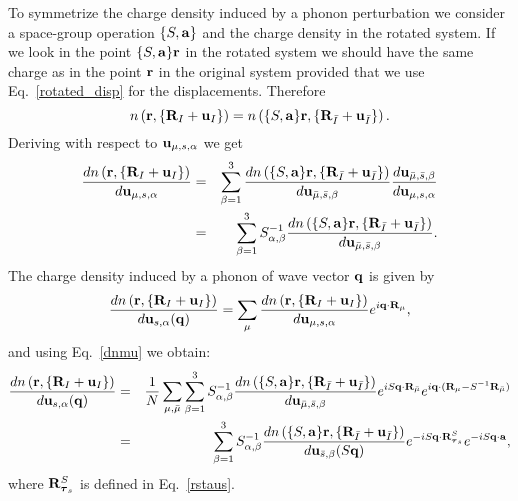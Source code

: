 \documentclass[12pt,a4paper,twoside]{report}
\begin{document}
To symmetrize the charge density induced by a phonon perturbation we consider a space-group operation $\{S,{\bf a}\}$
and the charge density in the rotated system. If
we look in the point $\{S,{\bf a}\} {\bf r}$ in the rotated system we should have the same charge as in the 
point ${\bf r}$ in the original system provided that we use Eq.~\ref{rotated_disp} for the displacements.
Therefore
\begin{equation}
n\left({\bf r}, \{{\bf R}_I + {\bf u}_I\}\right)
=n\left(\{S,{\bf a}\} {\bf r}, \{{\bf R}_{\bar I} + {\bf u}_{\bar I}\}\right).
\end{equation}
Deriving with respect to ${\bf u}_{\mu,s,\alpha}$ we get
\begin{eqnarray}
{d n\left({\bf r}, \{{\bf R}_I + {\bf u}_I\}\right)
\over d {\bf u}_{\mu,s,\alpha}}
&=&\sum_{\beta=1}^3 {d n\left(\{S,{\bf a}\} {\bf r}, \{{\bf R}_{\bar I} + {\bf u}_{\bar I}\}\right)
\over d {\bf u}_{\bar \mu,\bar s,\beta}} {d {\bf u}_{\bar \mu,\bar s,\beta} \over  
d {\bf u}_{\mu,s,\alpha} } \nonumber \\
&=& \sum_{\beta=1}^3 S^{-1}_{\alpha,\beta} {d n\left(\{S,{\bf a}\} {\bf r}, \{{\bf R}_{\bar I} + {\bf u}_{\bar I}\}\right)
\over d {\bf u}_{\bar \mu,\bar s,\beta}}.
\label{dnmu}
\end{eqnarray}
The charge density induced by a phonon of wave vector ${\bf q}$ is given by
\begin{equation}
{d n\left({\bf r}, \{{\bf R}_I + {\bf u}_I\}\right)
\over d {\bf u}_{s,\alpha}({\bf q})} =
\sum_\mu {d n\left({\bf r}, \{{\bf R}_I + {\bf u}_I\}\right)
\over d {\bf u}_{\mu,s,\alpha}} e^{i{\bf q}\cdot {\bf R}_\mu},
\label{drhoph}
\end{equation}
and using Eq.~\ref{dnmu} we obtain:
\begin{eqnarray}
{d n\left({\bf r}, \{{\bf R}_I + {\bf u}_I\}\right)
\over d {\bf u}_{s,\alpha}({\bf q})} &=&
{1\over N}\sum_{\mu,\bar \mu} \sum_{\beta=1}^3 S^{-1}_{\alpha,\beta} {d n\left(\{S,{\bf a}\} {\bf r}, \{{\bf R}_{\bar I} + {\bf u}_{\bar I}\}\right)
\over d {\bf u}_{\bar \mu,\bar s,\beta}}e^{iS{\bf q}\cdot {\bf R}_{\bar \mu} } e^{i{\bf q}\cdot ({\bf R}_\mu - S^{-1}{\bf R}_{\bar \mu}) } \nonumber \\
&=& \sum_{\beta=1}^3 S^{-1}_{\alpha,\beta} {d n\left(\{S,{\bf a}\} {\bf r}, \{{\bf R}_{\bar I} + {\bf u}_{\bar I}\}\right)
\over d {\bf u}_{\bar s,\beta} (S{\bf q})} e^{-iS{\bf q}\cdot {\bf R}^S_{{\boldsymbol{\tau}_s}}} e^{-iS{\bf q}\cdot {\bf a}},
\end{eqnarray}
where ${\bf R}^S_{{\boldsymbol{\tau}_s}}$ is defined in Eq.~\ref{rstaus}.
\end{document}
